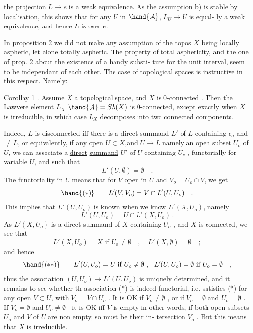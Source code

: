 the projection $L \to e$ is a weak equivalence.  As the assumption b) is stable
 by localisation, this shows that for any $U$ in $\hand{\mathcal{A}}$, $L_U \to U$ is equal-%
ly a weak equivalence,  and hence $L$ is  over $e$.

In proposition 2 we did not make any assumption of the topos $X$ being
locally aspheric,  let alone totally aspheric.  The  property of total
asphericity,  and the one of prop. 2 about the existence of a handy substi-%
tute for the unit interval,  seem to be independant of each other. The case
of topological spaces is instructive in this respect. Namely:

\uline{Corollay} 1 .  Assume $X$  a topological space,  and $X$ is $0$-connected .
Then the Lawvere element  $L_X$  $\hand{\mathcal{A}}= Sh(X)$  is  $0$-connected,  except exactly
when $X$ is irreducible,  in which case $L_X$ decomposes into two connected
components.

Indeed,  $L$ is disconnected iff there is a direct summand $L'$ of $L$
containing $e_o$ and $\neq L$,  or equivalently,  if  any open $U\subset X$,and $U \to L$
namely an open subset $U_o$ of $U$,  we can associate a \uline{direct} \uline{summand} $U'$ of $U$
containing $U_o$ ,  functorially for variable  $U$,  and such that
\[ L'(U,\emptyset) = \emptyset \quad . \]
The functoriality in $U$ means that for $V$ open in $U$ and $V_o = U_o \cap V$,  we get
\[ \hand{(*)} \qquad L'(V,V_o) = V \cap L'(U,U_o) \quad . \]
This implies that  $L'(U,U_o)$  is known when we know  $L'(X,U_o)$,
namely
\[ L'(U,U_o) = U \cap L'(X,U_o) \, . \]
As $L'(X,U_o)$ is a direct summand of $X$ containing $U_o$ ,  and $X$ is connected,
we see that
\[ L'(X,U_o) = X \text{ if } U_o \neq \emptyset \quad , \quad L'(X,\emptyset)= \emptyset \quad ; \]
and hence
\[ \hand{(**)} \qquad L'(U,U_o) = U \text{ if } U_o \neq \emptyset \ , \ \ L'(U,U_o) = \emptyset \text{ if } U_o = \emptyset \quad , \]
thus  the association  $(U,U_o) \mapsto L'(U,U_o)$ is uniquely determined,  and it
remains to see whether th association (*\hand{*}) is indeed functorial, i.e.
satisfies (*)  for any open $V \subset U$,  with $V_o = V\cap U_o$ .  It is OK if $V_o \neq \emptyset$ ,
  or if $V_o = \emptyset$ and $U_o = \emptyset$ .  
If $V_o = \emptyset$  and $U_o \neq \emptyset$ ,   it is OK iff $V$ is empty\hand{;} in other words, if
both  open subsets $U_o$ and $V$ of $U$ are non empty,  so must be their in-%
tersection $V_o$ .  But this means that $X$ is irreducible.

